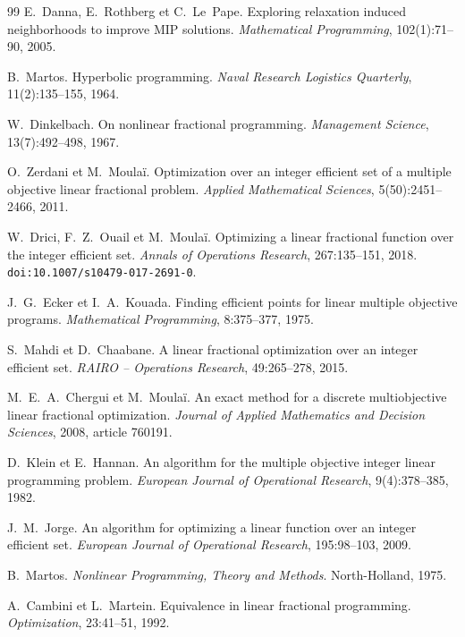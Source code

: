 \documentclass[11pt,a4paper]{article}
\theoremstyle{plain}
\theoremstyle{remark}
\begin{document}
\begin{thebibliography}{99}
E.~Danna, E.~Rothberg et C.~Le~Pape.
\newblock Exploring relaxation induced neighborhoods to improve MIP
  solutions.
\newblock \emph{Mathematical Programming}, 102(1):71--90, 2005.

B.~Martos.
\newblock Hyperbolic programming.
\newblock \emph{Naval Research Logistics Quarterly}, 11(2):135--155, 1964.

W.~Dinkelbach.
\newblock On nonlinear fractional programming.
\newblock \emph{Management Science}, 13(7):492--498, 1967.

O.~Zerdani et M.~Moulaï.
\newblock Optimization over an integer efficient set of a multiple objective
  linear fractional problem.
\newblock \emph{Applied Mathematical Sciences}, 5(50):2451--2466, 2011.

W.~Drici, F.~Z.~Ouail et M.~Moulaï.
\newblock Optimizing a linear fractional function over the integer efficient
  set.
\newblock \emph{Annals of Operations Research}, 267:135--151, 2018.
\newblock \texttt{doi:10.1007/s10479-017-2691-0}.

J.~G.~Ecker et I.~A.~Kouada.
\newblock Finding efficient points for linear multiple objective programs.
\newblock \emph{Mathematical Programming}, 8:375--377, 1975.

S.~Mahdi et D.~Chaabane.
\newblock A linear fractional optimization over an integer efficient set.
\newblock \emph{RAIRO -- Operations Research}, 49:265--278, 2015.

M.~E.~A.~Chergui et M.~Moulaï.
\newblock An exact method for a discrete multiobjective linear fractional
  optimization.
\newblock \emph{Journal of Applied Mathematics and Decision Sciences}, 2008,
  article 760191.

D.~Klein et E.~Hannan.
\newblock An algorithm for the multiple objective integer linear programming
  problem.
\newblock \emph{European Journal of Operational Research}, 9(4):378--385, 1982.

J.~M.~Jorge.
\newblock An algorithm for optimizing a linear function over an integer
  efficient set.
\newblock \emph{European Journal of Operational Research}, 195:98--103, 2009.

B.~Martos.
\newblock \emph{Nonlinear Programming, Theory and Methods}.
\newblock North-Holland, 1975.

A.~Cambini et L.~Martein.
\newblock Equivalence in linear fractional programming.
\newblock \emph{Optimization}, 23:41--51, 1992.


\end{thebibliography}
\end{document}
